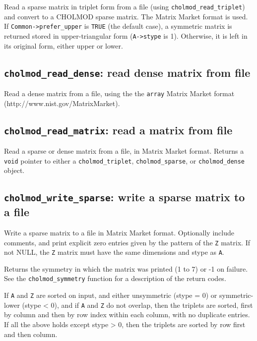 \documentclass[11pt]{article}
\begin{document}

Read a sparse matrix in triplet form from a file (using {\tt cholmod\_read\_triplet})
and convert to a CHOLMOD sparse matrix.
The Matrix Market format is used.
If {\tt Common->prefer\_upper} is {\tt TRUE} (the default case), a symmetric matrix is
returned stored in upper-triangular form ({\tt A->stype} is 1).
Otherwise, it is left in its original form, either upper or lower.

\newpage \subsection{{\tt cholmod\_read\_dense}: read dense matrix from file}


Read a dense matrix from a file, using the the {\tt array} 
Matrix Market format 
\newline (http://www.nist.gov/MatrixMarket).

\subsection{{\tt cholmod\_read\_matrix}: read a matrix from file}


Read a sparse or dense matrix from a file, in Matrix Market format.
Returns a {\tt void} pointer to either a
{\tt cholmod\_triplet},
{\tt cholmod\_sparse}, or
{\tt cholmod\_dense} object.

\newpage \subsection{{\tt cholmod\_write\_sparse}: write a sparse matrix to a file}


Write a sparse matrix to a file in Matrix Market format.   Optionally include
comments, and print explicit zero entries given by the pattern of the {\tt Z}
matrix.  If not NULL, the {\tt Z} matrix must have the same dimensions and stype
as {\tt A}.

Returns the symmetry in which the matrix was printed
(1 to 7) or -1 on failure.  See the {\tt cholmod\_symmetry} function for
a description of the return codes.

If {\tt A} and {\tt Z} are sorted on input, and either unsymmetric (stype = 0) or
symmetric-lower (stype < 0), and if {\tt A} and {\tt Z} do not overlap,
then the triplets
are sorted, first by column and then by row index within each column, with
no duplicate entries.  If all the above holds except stype > 0, then the
triplets are sorted by row first and then column.
\end{document}
